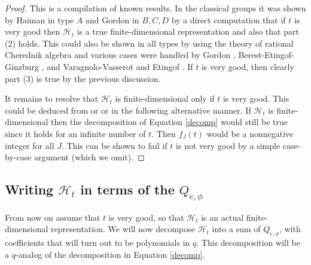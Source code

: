 \documentclass[10pt]{amsart}
\newcommand{\zz}{\mathbf Z}
\renewcommand{\H}{{\mathcal{H}_t}}
\theoremstyle{plain}
\theoremstyle{definition}
\theoremstyle{remark}
\begin{document}
\begin{proof}
This is a compilation of known results.  In the classical groups it was shown by Haiman \cite{haiman} in type $A$ and Gordon \cite{gordon:diagonal} in $B, C, D$ by a direct computation that if $t$ is very good then $\H$ is a true finite-dimensional representation and also that part (2) holds.  This could also be shown in all types by using the theory of rational Cherednik algebra and various cases were handled by Gordon \cite{gordon:diagonal}, Berest-Etingof-Ginzburg \cite{beg}, and Varagnolo-Vasserot \cite{vv} and Etingof \cite{etingof}.  If $t$ is very good, then clearly part (3) is true by the previous discussion.  

It remains to resolve that $\H$ is finite-dimensional only if $t$ is very good.  This could be deduced from \cite{vv} or \cite{etingof} or in the following alternative manner.  If $\H$ is finite-dimensional then the decomposition of Equation \ref{decomp} would still be true since it holds for an infinite number of $t$.  Then $f_J(t)$ would be a nonnegative integer for all $J$.  This can be shown to fail if $t$ is not very good by a simple case-by-case argument (which we omit).
\end{proof}

%


\subsection{\texorpdfstring{Writing $\H$ in terms of the $Q_{e, \phi}$}{Decomposing H into Springer representations}}

From now on assume that $t$ is very good, so that $\H$ is an actual finite-dimensional representation.
We will now decompose $\H$ into a sum of $Q_{e, \phi}$, with coefficients that will turn out to be polynomials in $q$.  
This decomposition will be a $q$-analog of the decomposition in Equation \ref{decomp}.
 
\end{document}
